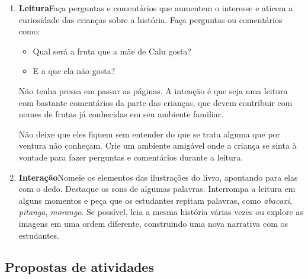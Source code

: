 \documentclass[11pt]{extarticle}
\begin{document}
\begin{enumerate}



\item \textbf{Leitura}\quad Faça perguntas e comentários que aumentem o 
interesse e aticem a curiosidade das crianças sobre a história. Faça 
perguntas ou comentários como: 

\begin{itemize}
\item Qual será a fruta que a mãe de Calu gosta?
\item E a que ela não gosta?
\end{itemize}

Não tenha pressa em passar as páginas.
A intenção é que seja uma leitura com bastante comentários
da parte das crianças, que devem contribuir com nomes de 
frutas já conhecidas em seu ambiente familiar.

Não deixe que eles fiquem sem entender do que se trata alguma que
por ventura não conheçam. Crie 
um ambiente amigável onde a criança se sinta à vontade para fazer 
perguntas e comentários durante a leitura.


\item \textbf{Interação}\quad Nomeie os elementos das ilustrações 
do livro, apontando para elas com o dedo. Destaque os sons de algumas 
palavras. Interrompa a leitura em alguns momentos e peça que 
os estudantes repitam palavras, como \textit{abacaxi}, \textit{pitanga}, \textit{morango}. Se possível, 
leia a mesma história várias vezes ou explore as imagens em uma ordem 
diferente, construindo uma nova narrativa com os estudantes. 
\end{enumerate}


\subsection{Propostas de atividades}

\end{document}
